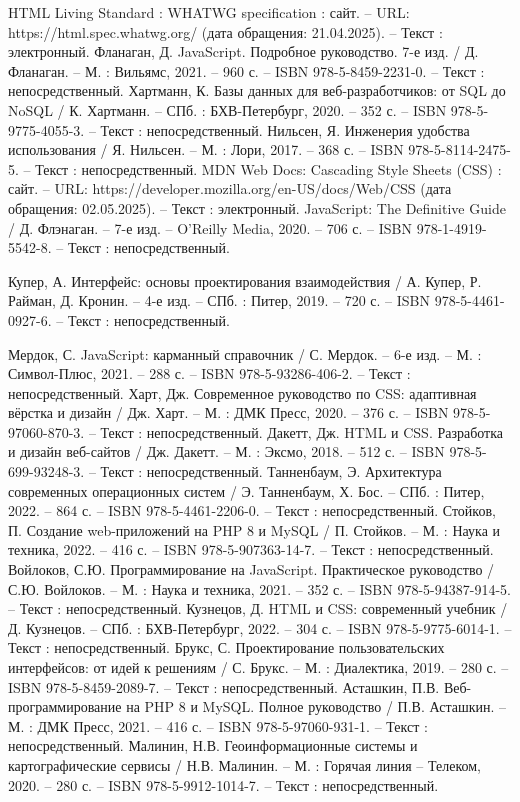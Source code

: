 \begin{thebibliography}{21}
 	 HTML Living Standard : WHATWG specification : сайт. – URL: https://html.spec.whatwg.org/ (дата обращения: 21.04.2025). – Текст : электронный.
 	 Фланаган, Д. JavaScript. Подробное руководство. 7-е изд. / Д. Фланаган. – М. : Вильямс, 2021. – 960 с. – ISBN 978-5-8459-2231-0. – Текст : непосредственный.
		Хартманн, К. Базы данных для веб-разработчиков: от SQL до NoSQL / К. Хартманн. – СПб. : БХВ-Петербург, 2020. – 352 с. – ISBN 978-5-9775-4055-3. – Текст : непосредственный. 
	 Нильсен, Я. Инженерия удобства использования / Я. Нильсен. – М. : Лори, 2017. – 368 с. – ISBN 978-5-8114-2475-5. – Текст : непосредственный.
	 MDN Web Docs: Cascading Style Sheets (CSS) : сайт. – URL: https://developer.mozilla.org/en-US/docs/Web/CSS (дата обращения: 02.05.2025). – Текст : электронный.
	 JavaScript: The Definitive Guide / Д. Флэнаган. – 7-е изд. – O’Reilly Media, 2020. – 706 с. – ISBN 978-1-4919-5542-8. – Текст : непосредственный.
	
	 Купер, А. Интерфейс: основы проектирования взаимодействия / А. Купер, Р. Райман, Д. Кронин. – 4-е изд. – СПб. : Питер, 2019. – 720 с. – ISBN 978-5-4461-0927-6. – Текст : непосредственный.
	
	 Мердок, С. JavaScript: карманный справочник / С. Мердок. – 6-е изд. – М. : Символ-Плюс, 2021. – 288 с. – ISBN 978-5-93286-406-2. – Текст : непосредственный.
	 Харт, Дж. Современное руководство по CSS: адаптивная вёрстка и дизайн / Дж. Харт. – М. : ДМК Пресс, 2020. – 376 с. – ISBN 978-5-97060-870-3. – Текст : непосредственный.
	 Дакетт, Дж. HTML и CSS. Разработка и дизайн веб-сайтов / Дж. Дакетт. – М. : Эксмо, 2018. – 512 с. – ISBN 978-5-699-93248-3. – Текст : непосредственный.
	 Танненбаум, Э. Архитектура современных операционных систем / Э. Танненбаум, Х. Бос. – СПб. : Питер, 2022. – 864 с. – ISBN 978-5-4461-2206-0. – Текст : непосредственный.
	 Стойков, П. Создание web-приложений на PHP 8 и MySQL / П. Стойков. – М. : Наука и техника, 2022. – 416 с. – ISBN 978-5-907363-14-7. – Текст : непосредственный.
	 Войлоков, С.Ю. Программирование на JavaScript. Практическое руководство / С.Ю. Войлоков. – М. : Наука и техника, 2021. – 352 с. – ISBN 978-5-94387-914-5. – Текст : непосредственный.
	 Кузнецов, Д. HTML и CSS: современный учебник / Д. Кузнецов. – СПб. : БХВ-Петербург, 2022. – 304 с. – ISBN 978-5-9775-6014-1. – Текст : непосредственный.
	 Брукс, С. Проектирование пользовательских интерфейсов: от идей к решениям / С. Брукс. – М. : Диалектика, 2019. – 280 с. – ISBN 978-5-8459-2089-7. – Текст : непосредственный.
	 Асташкин, П.В. Веб-программирование на PHP 8 и MySQL. Полное руководство / П.В. Асташкин. – М. : ДМК Пресс, 2021. – 416 с. – ISBN 978-5-97060-931-1. – Текст : непосредственный.
	 Малинин, Н.В. Геоинформационные системы и картографические сервисы / Н.В. Малинин. – М. : Горячая линия – Телеком, 2020. – 280 с. – ISBN 978-5-9912-1014-7. – Текст : непосредственный.

\end{thebibliography}
